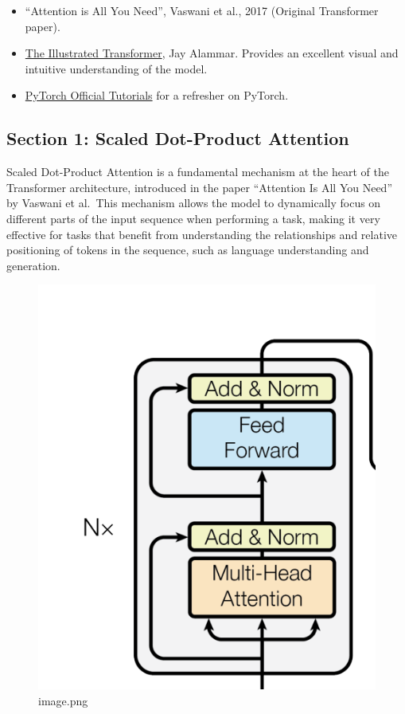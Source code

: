 \documentclass[11pt]{article}
\providecommand{\tightlist}{%
      \setlength{\itemsep}{0pt}\setlength{\parskip}{0pt}}
\begin{document}
\begin{itemize}
\tightlist
\item
  ``Attention is All You Need'', Vaswani et al., 2017 (Original
  Transformer paper).
\item
  \href{http://jalammar.github.io/illustrated-transformer/}{The
  Illustrated Transformer}, Jay Alammar. Provides an excellent visual
  and intuitive understanding of the model.
\item
  \href{https://pytorch.org/tutorials/}{PyTorch Official Tutorials} for
  a refresher on PyTorch.
\end{itemize}

    \subsection{Section 1: Scaled Dot-Product
Attention}\label{section-1-scaled-dot-product-attention}

    Scaled Dot-Product Attention is a fundamental mechanism at the heart of
the Transformer architecture, introduced in the paper ``Attention Is All
You Need'' by Vaswani et al.~This mechanism allows the model to
dynamically focus on different parts of the input sequence when
performing a task, making it very effective for tasks that benefit from
understanding the relationships and relative positioning of tokens in
the sequence, such as language understanding and generation.

\begin{figure}
\centering
\includegraphics{image.png}
\caption{image.png}
\end{figure}
\end{document}
